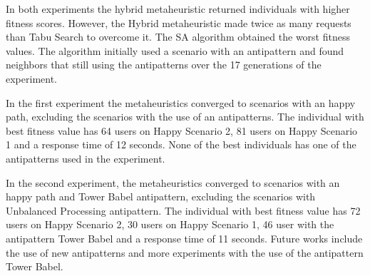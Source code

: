 \documentclass[times]{stvrauth}
\begin{document}
In both experiments the hybrid metaheuristic returned individuals with higher fitness scores. However, the Hybrid metaheuristic made twice as many requests than Tabu Search to overcome it. The SA algorithm obtained the worst fitness values. The algorithm initially used a scenario with an antipattern and found neighbors that still using the antipatterns over the 17 generations of the experiment.

In the first experiment the metaheuristics converged to scenarios with an happy path, excluding the scenarios with the use of an antipatterns. The individual with best fitness value has 64 users on Happy Scenario 2, 81 users on Happy Scenario 1 and a response time of 12 seconds. None of the best individuals has one of the antipatterns used in the experiment.


In the second experiment,  the metaheuristics converged to scenarios with an happy path and Tower Babel antipattern, excluding the scenarios with Unbalanced Processing antipattern. The individual with best fitness value has 72 users on Happy Scenario 2, 30 users on Happy Scenario 1, 46 user with the antipattern Tower Babel and a response time of 11 seconds. Future works include the use of new antipatterns and more experiments with the use of the antipattern Tower Babel.

\FloatBarrier



\end{document}
